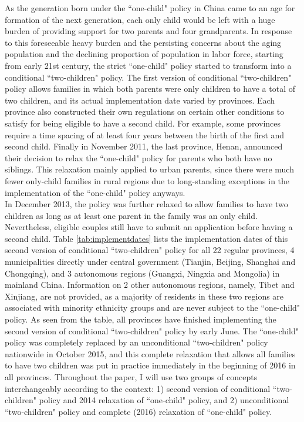\documentclass[12pt]{extarticle}
\begin{document}
\indent As the generation born under the ``one-child" policy in China came to an age for formation of the next generation, each only child would be left with a huge burden of providing support for two parents and four grandparents. In response to this foreseeable heavy burden and the persisting concerns about the aging population and the declining proportion of population in labor force, starting from early 21st century, the strict ``one-child" policy started to transform into a conditional ``two-children" policy. The first version of conditional ``two-children" policy allows families in which both parents were only children to have a total of two children, and its actual implementation date varied by provinces. Each province also constructed their own regulations on certain other conditions to satisfy for being eligible to have a second child. For example, some provinces require a time spacing of at least four years between the birth of the first and second child. Finally in November 2011, the last province, Henan, announced their decision to relax the ``one-child" policy for parents who both have no siblings. This relaxation mainly applied to urban parents, since there were much fewer only-child families in rural regions due to long-standing exceptions in the implementation of the ``one-child" policy anyways. \\
\indent In December 2013, the policy was further relaxed to allow families to have two children as long as at least one parent in the family was an only child. Nevertheless, eligible couples still have to submit an application before having a second child. Table \ref{tab:implementdates} lists the implementation dates of this second version of conditional ``two-children" policy for all 22 regular provinces, 4 municipalities directly under central government (Tianjin, Beijing, Shanghai and Chongqing), and 3 autonomous regions (Guangxi, Ningxia and Mongolia) in mainland China. Information on 2 other autonomous regions, namely, Tibet and Xinjiang, are not provided, as a majority of residents in these two regions are associated with minority ethnicity groups and are never subject to the ``one-child" policy. As seen from the table, all provinces have finished implementing the second version of conditional ``two-children" policy by early June. The ``one-child" policy was completely replaced by an unconditional ``two-children" policy nationwide in October 2015, and this complete relaxation that allows all families to have two children was put in practice immediately in the beginning of 2016 in all provinces. Throughout the paper, I will use two groups of concepts interchangeably according to the context: 1) second version of conditional ``two-children" policy and 2014 relaxation of ``one-child" policy, and 2) unconditional ``two-children" policy and complete (2016) relaxation of ``one-child" policy.
\end{document}
